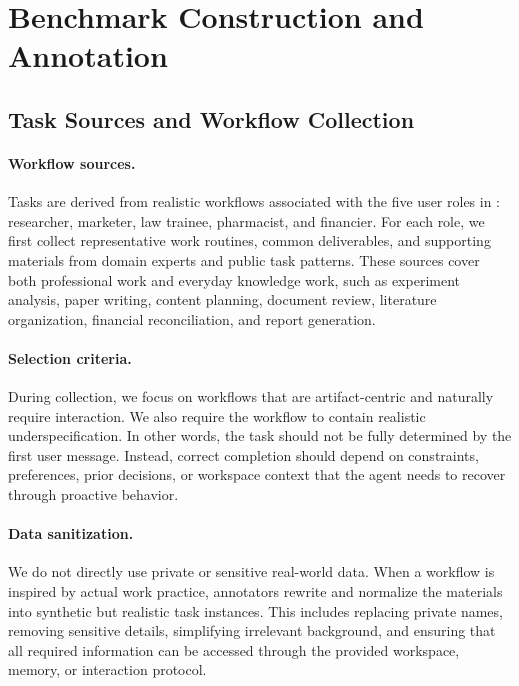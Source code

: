 \section{Benchmark Construction and Annotation}
\label{app:data_construction}

\subsection{Task Sources and Workflow Collection}
\label{app:task_sources}

\paragraph{Workflow sources.}

Tasks are derived from realistic workflows associated with the five user roles in {\bench}: researcher, marketer, law trainee, pharmacist, and financier. For each role, we first collect representative work routines, common deliverables, and supporting materials from domain experts and public task patterns. These sources cover both professional work and everyday knowledge work, such as experiment analysis, paper writing, content planning, document review, literature organization, financial reconciliation, and report generation.

\paragraph{Selection criteria.}
During collection, we focus on workflows that are artifact-centric and naturally require interaction. We also require the workflow to contain realistic underspecification. In other words, the task should not be fully determined by the first user message. Instead, correct completion should depend on constraints, preferences, prior decisions, or workspace context that the agent needs to recover through proactive behavior.

\paragraph{Data sanitization.}
We do not directly use private or sensitive real-world data. When a workflow is inspired by actual work practice, annotators rewrite and normalize the materials into synthetic but realistic task instances. This includes replacing private names, removing sensitive details, simplifying irrelevant background, and ensuring that all required information can be accessed through the provided workspace, memory, or interaction protocol.

